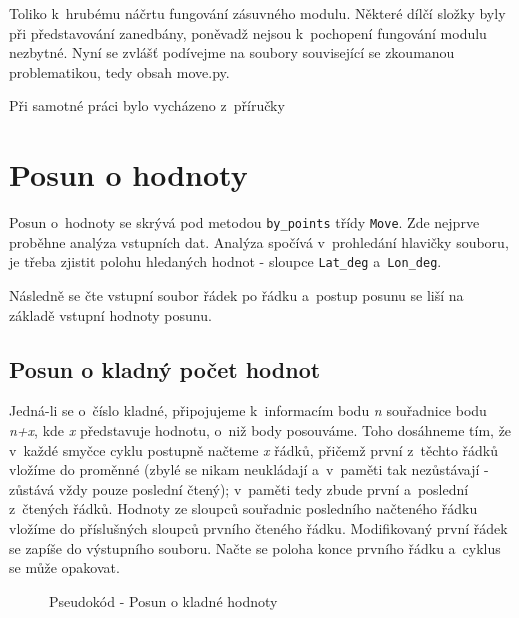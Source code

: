 Toliko k~hrubému náčrtu fungování zásuvného modulu. Některé dílčí složky byly při představování
zane\-dbány, poněvadž nejsou k~pochopení fungování mo\-dulu nezbytné. Nyní se zvlášť podívejme na
soubory související se zkoumanou pro\-blematikou, tedy obsah move.py. 

Při samotné práci bylo vycházeno z~příručky \citep{cookbook}


\section{Posun o hodnoty}
\label{by_points}

Posun o~hodnoty se skrývá pod metodou {\tt by\_points} třídy {\tt Move}.
Zde nejprve proběhne analýza vstupních dat.
Analýza spočívá v~prohledání hlavičky souboru, je třeba zjistit polohu hledaných hodnot - sloupce
{\tt Lat\_deg} a~{\tt Lon\_deg}. 

Následně se čte vstupní soubor řádek po řádku a~postup posunu se liší na základě vstupní hodnoty posunu. 

\subsection{Posun o kladný počet hodnot}
\label{kladnehodnoty}

Jedná-li se o~číslo kladné, připojujeme k~informacím bodu \textit{n} souřadnice bodu
\textit{n+x}, kde \textit{x} představuje hodnotu, o~niž body posouváme. Toho dosáhneme tím, že
v~každé smyčce cyklu postupně načteme \textit{x} řádků, přičemž první z~těchto řádků vložíme do proměnné
(zbylé se nikam neukládají a~v~paměti tak nezůstávají - zůstává vždy pouze poslední čtený);
v~paměti tedy zbude první a~poslední z~čtených řádků. Hodnoty ze sloupců souřadnic posledního
načteného řádku vložíme do příslušných sloupců prvního čteného řádku. Modifikovaný první
řádek se zapíše do výstupního souboru. Načte se poloha konce prvního řádku a~cyklus se může opakovat. 

    \begin{figure}[h]
    \centering
    \begin{algorithmic}[1]
    \ENDWHILE
    \end{algorithmic}
    \caption{Pseudokód - Posun o kladné hodnoty}
    \label{fig:pseudokladnehodnoty}
    \end{figure}


